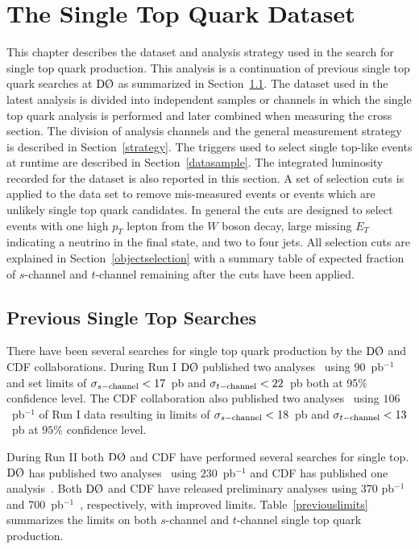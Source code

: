 \chapter{The Single Top Quark Dataset}
\label{selectioncuts}
\label{analysis}
\label{data}

This chapter describes the dataset and analysis strategy used in the search for single top quark production. This analysis is a continuation of previous single top quark searches at $\dzero$ as summarized in Section~\ref{previous}. The dataset used in the latest analysis is divided into independent samples or channels in which the single top quark analysis is performed and later combined when measuring the cross section. The division of analysis channels and the general measurement strategy is described in Section~\ref{strategy}. The triggers used to select single top-like events at runtime are described in Section~\ref{datasample}. The integrated luminosity recorded for the dataset is also reported in this section. A set of selection cuts is applied to the data set to remove mis-measured events or events which are unlikely single top quark candidates. In general the cuts are designed to select events with one high $p_{T}$ lepton from the $W$ boson decay, large missing $E_{T}$ indicating a neutrino in the final state, and two to four jets. All selection cuts are explained in Section~\ref{objectselection} with a summary table of expected fraction of $s$-channel and $t$-channel remaining after the cuts have been applied.

\section{Previous Single Top Searches}
\label{previous}

There have been several searches for single top quark production by the $\dzero$ and CDF collaborations. During Run I $\dzero$ published two analyses~\cite{Abbott:2000pa, Abazov:2001ns} using $90$~pb$^{-1}$ and set limits of $\sigma_{s-\rm{channel}} < 17$~pb and $\sigma_{t-\rm{channel}} < 22$~pb both at 95$\%$ confidence level. The CDF collaboration also published two analyses~\cite{Acosta:2004er, Acosta:2001un} using $106$~pb$^{-1}$ of Run I data resulting in limits of  $\sigma_{s-\rm{channel}} < 18$~pb and $\sigma_{t-\rm{channel}} < 13$~pb at $95\%$ confidence level.

During Run II both $\dzero$ and CDF have performed several searches for single top. $\dzero$ has published two analyses~\cite{Abazov:2005zz,Abazov:2006uq} using $230$~pb$^{-1}$ and CDF has published one analysis~\cite{Acosta:2004bs}. Both $\dzero$ and CDF have released preliminary analyses using 370 pb$^{-1}$~\cite{run2-d0-370} and 700~pb$^{-1}$~\cite{run2-cdf-bnn-700}, respectively, with improved limits.  Table~\ref{previouslimits} summarizes the limits on both $s$-channel and $t$-channel single top quark production.

